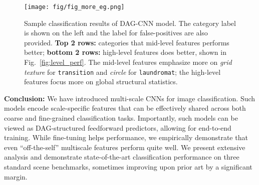 \documentclass[10pt,twocolumn,letterpaper]{article}
\begin{document}
\begin{figure}[htbp]
\centering
	\texttt{[image: fig/fig\_more\_eg.png]}
\caption{Sample classification results of DAG-CNN model. The category label is shown on the left and the label for false-positives are also provided. \textbf{Top 2 rows:} categories that mid-level features performs better; \textbf{bottom 2 rows:} high-level features does better, shown in Fig.~\ref{fig:level_perf}. The mid-level features emphasize more on \textit{grid texture} for {\tt transition} and \textit{circle} for {\tt laundromat}; the high-level features focus more on global structural statistics.}

\label{fig:more_eg}
\end{figure}



{\bf Conclusion:} We have introduced multi-scale CNNs for image classification. Such models encode scale-specific features that can be effectively shared across both coarse and fine-grained classification tasks. Importantly, such models can be viewed as DAG-structured feedforward predictors, allowing for end-to-end training. While fine-tuning helps performance, we empirically demonstrate that even ``off-the-self'' multiscale features perform quite well. We present extensive analysis and demonstrate state-of-the-art classification performance on three standard scene benchmarks, sometimes improving upon prior art by a significant margin. 
{\small


}
\end{document}
